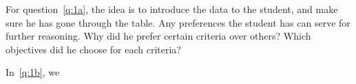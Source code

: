 \documentclass[answers, 10pt, UKenglish]{exam}
\begin{document}
\begin{questions}
\begin{solutionorbox}
{		For question~\cref{q:1a}, the idea is to introduce the data to the 
		student, and make sure he has gone through the table. Any preferences
		the student has can serve for further reasoning. Why did he prefer
		certain criteria over others? Which objectives did he choose for each
		criteria?

		In~\cref{q:1b}, we 
	}
	\end{solutionorbox}
	
	\question
	\begin{solutionorbox}
	\end{solutionorbox}

	\question
	\begin{solutionorbox}
	\end{solutionorbox}
	
	\question 
	\begin{solutionorbox}
	\end{solutionorbox}
	
	\question 
	\begin{solutionorbox}
	\end{solutionorbox}
	
	\question 
	\begin{solutionorbox}
	\end{solutionorbox}
\end{questions}
\end{document}
